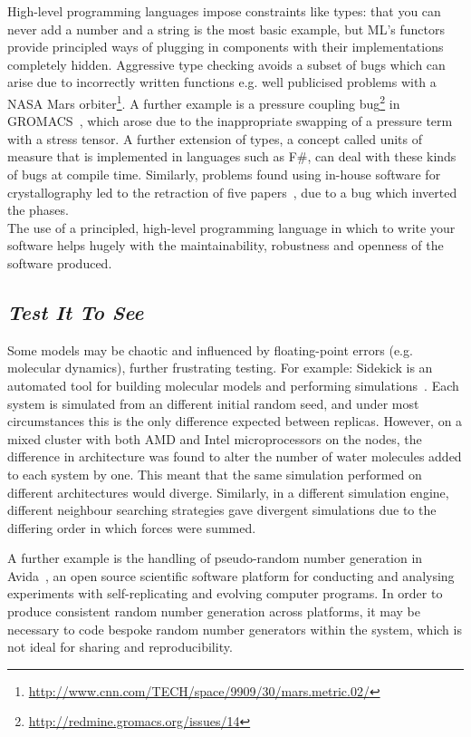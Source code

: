 \documentclass[a4paper,11pt]{article}
\begin{document}
High-level programming languages impose constraints like types: that
you can never add a number and a string is the most basic example, but
ML's functors provide principled ways of plugging in components with
their implementations completely hidden. Aggressive type checking
avoids a subset of bugs which can arise due to incorrectly written
functions e.g. well publicised problems with a NASA Mars
orbiter\footnote{\url{http://www.cnn.com/TECH/space/9909/30/mars.metric.02/}}.
A further example is a pressure coupling
bug\footnote{\url{http://redmine.gromacs.org/issues/14}} in
GROMACS~\cite{Hess2008}, which arose due to the inappropriate swapping
of a pressure term with a stress tensor.  A further extension of
types, a concept called units of measure that is implemented in
languages such as F\#, can deal with these kinds of bugs at compile
time. Similarly, problems found using in-house software for
crystallography led to the retraction of five
papers~\cite{Miller2006}, due to a bug which inverted the phases.\\

 The use of a
principled, high-level programming language in which to write your
software helps hugely with the maintainability, robustness and
openness of the software produced.

\subsection{{\emph{Test It To See}}}

Some models may be chaotic and influenced by floating-point errors
(e.g. molecular dynamics), further frustrating testing. For example:
Sidekick is an automated tool for building molecular models and
performing simulations~\cite{Hall2014Sidekick}. Each system is
simulated from an different initial random seed, and under most
circumstances this is the only difference expected between
replicas. However, on a mixed cluster with both AMD and Intel
microprocessors on the nodes, the difference in architecture was found
to alter the number of water molecules added to each system by
one. This meant that the same simulation performed on different
architectures would diverge. Similarly, in a different simulation
engine, different neighbour searching strategies gave divergent
simulations due to the differing order in which forces were summed.

A further example is the handling of pseudo-random number generation in
Avida~\cite{ofria+wilke:2004}, an open source scientific software
platform for conducting and analysing experiments with
self-replicating and evolving computer programs. In order to produce
consistent random number generation across platforms, it may be
necessary to code bespoke random number generators within the system,
which is not ideal for sharing and reproducibility.\\
\end{document}
